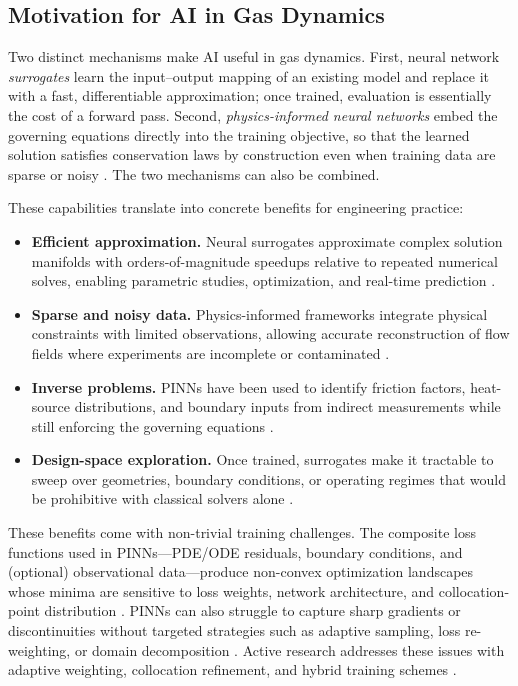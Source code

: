\documentclass[11pt,a4paper]{report}
\begin{document}
\subsection{Motivation for AI in Gas Dynamics}

Two distinct mechanisms make AI useful in gas dynamics. First, neural network \emph{surrogates} learn the input--output mapping of an existing model and replace it with a fast, differentiable approximation; once trained, evaluation is essentially the cost of a forward pass. Second, \emph{physics-informed neural networks} embed the governing equations directly into the training objective, so that the learned solution satisfies conservation laws by construction even when training data are sparse or noisy \cite{Raissi2019PINN, Michaloglou2025}. The two mechanisms can also be combined.

These capabilities translate into concrete benefits for engineering practice:

\begin{itemize}
    \item \textbf{Efficient approximation.} Neural surrogates approximate complex solution manifolds with orders-of-magnitude speedups relative to repeated numerical solves, enabling parametric studies, optimization, and real-time prediction \cite{Ren2025}.
    \item \textbf{Sparse and noisy data.} Physics-informed frameworks integrate physical constraints with limited observations, allowing accurate reconstruction of flow fields where experiments are incomplete or contaminated \cite{Michaloglou2025}.
    \item \textbf{Inverse problems.} PINNs have been used to identify friction factors, heat-source distributions, and boundary inputs from indirect measurements while still enforcing the governing equations \cite{Raissi2019PINN, Michaloglou2025, Roohi2025}.
    \item \textbf{Design-space exploration.} Once trained, surrogates make it tractable to sweep over geometries, boundary conditions, or operating regimes that would be prohibitive with classical solvers alone \cite{Ren2025}.
\end{itemize}

These benefits come with non-trivial training challenges. The composite loss functions used in PINNs---PDE/ODE residuals, boundary conditions, and (optional) observational data---produce non-convex optimization landscapes whose minima are sensitive to loss weights, network architecture, and collocation-point distribution \cite{Urban2025, Lu2021hPINN}. PINNs can also struggle to capture sharp gradients or discontinuities without targeted strategies such as adaptive sampling, loss re-weighting, or domain decomposition \cite{Urban2025, Ren2025, Kharazmi2021}. Active research addresses these issues with adaptive weighting, collocation refinement, and hybrid training schemes \cite{Jagtap2020, Cuomo2022, Ren2025}.
\end{document}
